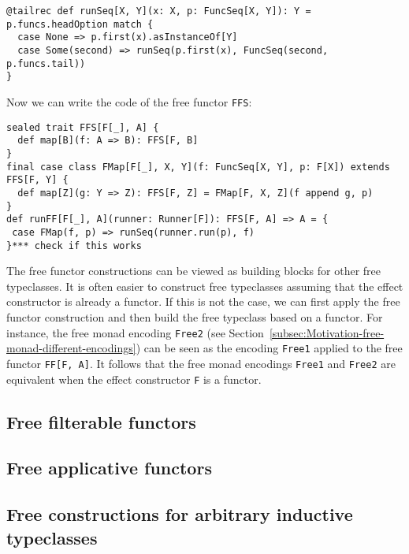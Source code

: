 \begin{lstlisting}
@tailrec def runSeq[X, Y](x: X, p: FuncSeq[X, Y]): Y = p.funcs.headOption match {
  case None => p.first(x).asInstanceOf[Y]
  case Some(second) => runSeq(p.first(x), FuncSeq(second, p.funcs.tail))
}
\end{lstlisting}
Now we can write the code of the free functor \lstinline!FFS!:
\begin{lstlisting}
sealed trait FFS[F[_], A] {
  def map[B](f: A => B): FFS[F, B]
}
final case class FMap[F[_], X, Y](f: FuncSeq[X, Y], p: F[X]) extends FFS[F, Y] {
  def map[Z](g: Y => Z): FFS[F, Z] = FMap[F, X, Z](f append g, p)
}
def runFF[F[_], A](runner: Runner[F]): FFS[F, A] => A = {
 case FMap(f, p) => runSeq(runner.run(p), f)
}*** check if this works
\end{lstlisting}
The free functor constructions can be viewed as building blocks for
other free typeclasses. It is often easier to construct free typeclasses
assuming that the effect constructor is already a functor. If this
is not the case, we can first apply the free functor construction
and then build the free typeclass based on a functor. For instance,
the free monad encoding \lstinline!Free2!
(see Section~\ref{subsec:Motivation-free-monad-different-encodings})
can be seen as the encoding \lstinline!Free1!
applied to the free functor \lstinline!FF[F, A]!.
It follows that the free monad encodings \lstinline!Free1!
and \lstinline!Free2! are
equivalent when the effect constructor \lstinline!F!
is a functor. 

\subsection{Free filterable functors}

\subsection{Free applicative functors}

\subsection{Free constructions for arbitrary inductive typeclasses\label{subsec:Free-constructions-for-arbitrary-typeclasses}}

